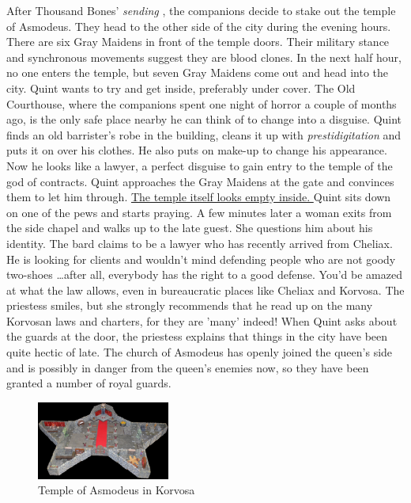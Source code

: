 After Thousand Bones' {\itshape sending} , the companions decide to stake out the temple of Asmodeus. They head to the other side of the city during the evening hours. There are six Gray Maidens in front of the temple doors. Their military stance and synchronous movements suggest they are blood clones. In the next half hour, no one enters the temple, but seven Gray Maidens come out and head into the city. Quint wants to try and get inside, preferably under cover. The Old Courthouse, where the companions spent one night of horror a couple of months ago, is the only safe place nearby he can think of to change into a disguise. Quint finds an old barrister's robe in the building, cleans it up with  {\itshape prestidigitation} and puts it on over his clothes. He also puts on make-up to change his appearance. Now he looks like a lawyer, a perfect disguise to gain entry to the temple of the god of contracts. Quint approaches the Gray Maidens at the gate and convinces them to let him through. \hyperref[fig:Temple-of-Asmodeus-in-Korvosa-614608557]{ The temple itself looks empty inside. } Quint sits down on one of the pews and starts praying. A few minutes later a woman exits from the side chapel and walks up to the late guest. She questions him about his identity. The bard claims to be a lawyer who has recently arrived from Cheliax. He is looking for clients and wouldn't mind defending people who are not goody two-shoes \ldots after all, everybody has the right to a good defense. You'd be amazed at what the law allows, even in bureaucratic places like Cheliax and Korvosa. The priestess smiles, but she strongly recommends that he read up on the many Korvosan laws and charters, for they are 'many' indeed! When Quint asks about the guards at the door, the priestess explains that things in the city have been quite hectic of late. The church of Asmodeus has openly joined the queen's side and is possibly in danger from the queen's enemies now, so they have been granted a number of royal guards. \\

\begin{figure}[h]
	\centering
	\includegraphics[width=0.39\textwidth]{images/Temple-of-Asmodeus-in-Korvosa-614608557.jpg}
	\caption{Temple of Asmodeus in Korvosa}
	\label{fig:Temple-of-Asmodeus-in-Korvosa-614608557}
\end{figure}

